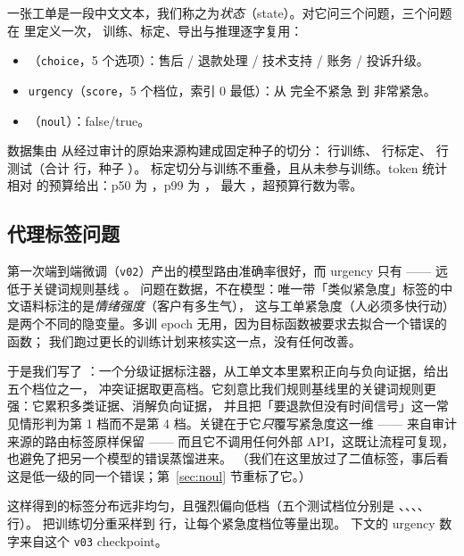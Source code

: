 \documentclass[11pt,a4paper]{article}
\begin{document}
一张工单是一段中文文本，我们称之为\emph{状态}（state）。对它问三个问题，三个问题在  里定义一次，
训练、标定、导出与推理逐字复用：

\begin{itemize}
  \item {}（\texttt{choice}，5 个选项）：售后 / 退款处理 / 技术支持 / 账务 / 投诉升级。
  \item \texttt{urgency}（\texttt{score}，5 个档位，索引 0 最低）：从 完全不紧急 到 非常紧急。
  \item {}（\texttt{noul}）：false/true。
\end{itemize}

数据集由  从经过审计的原始来源构建成固定种子的切分：
\RowsTrain{} 行训练、\RowsCalib{} 行标定、\RowsTest{} 行测试（合计 \DataTotalRows{} 行，种子 \SeedAll{}）。
标定切分与训练不重叠，且从未参与训练。token 统计相对 \TokBudget{} 的预算给出：p50 为 \TokPFiveZero，p99 为 \TokPNineNine，
最大 \TokMax，超预算行数为零。

\subsection{代理标签问题}

第一次端到端微调（\texttt{v02}）产出的模型路由准确率很好，而 urgency 只有 \AccScoreVZeroTwo{} —— 远低于关键词规则基线 \RulesAccScore{}。
问题在数据，不在模型：唯一带「类似紧急度」标签的中文语料标注的是\emph{情绪强度}（客户有多生气），
这与工单紧急度（人必须多快行动）是两个不同的隐变量。多训 epoch 无用，因为目标函数被要求去拟合一个错误的函数；
我们跑过更长的训练计划来核实这一点，没有任何改善。

于是我们写了 ：一个分级证据标注器，从工单文本里累积正向与负向证据，给出五个档位之一，
冲突证据取更高档。它刻意比我们规则基线里的关键词规则更强：它累积多类证据、消解负向证据，
并且把「要退款但没有时间信号」这一常见情形判为第 1 档而不是第 4 档。关键在于它\emph{只}覆写紧急度这一维 ——
来自审计来源的路由标签原样保留 —— 而且它不调用任何外部 API，这既让流程可复现，也避免了把另一个模型的错误蒸馏进来。
（我们在这里放过了二值标签，事后看这是低一级的同一个错误；第~\ref{sec:noul} 节重标了它。）

这样得到的标签分布远非均匀，且强烈偏向低档（五个测试档位分别是 \UrgDistAfterZero{}、\UrgDistAfterOne{}、\UrgDistAfterTwo{}、\UrgDistAfterThree{}、\UrgDistAfterFour{} 行）。
 把训练切分重采样到 \RowsTrainBalanced{} 行，让每个紧急度档位等量出现。
下文的 urgency 数字来自这个 \texttt{v03} checkpoint。
\end{document}
